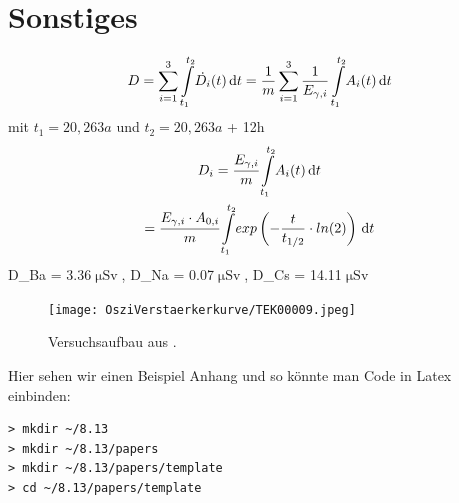 \documentclass[aps,twocolumn,secnumarabic,nobalancelastpage,amsmath,amssymb,
nofootinbib,superscriptaddress]{revtex4-1}
\begin{document}
\clearpage
\appendix

\section{Sonstiges}

\begin{equation}
  D = \sum\limits_{i=1}^3 \int\limits_{t_1}^{t_2} \! \dot{D_i}(t) \, \mathrm{d}t = \frac{1}{m}\sum\limits_{i=1}^3
  \frac{1}{E_{\gamma,i}} \int\limits_{t_1}^{t_2} \! A_{i}(t) \, \mathrm{d}t  \newline
\end{equation}
mit $t_1 = 20,263a$ und $t_2 = 20,263a$ + 12h
\begin{equation}
  \begin{gathered}
    D_i = \cfrac{E_{\gamma,i}}{m} \int\limits_{t_1}^{t_2} \! A_i(t) \, \mathrm{d}t \\
    = \cfrac{E_{\gamma,i}\cdot A_{0,i}}{m} \int\limits_{t_1}^{t_2} \! exp\left(-\frac{t}{t_{1/2}}\cdot ln(2)\right) \, \mathrm{d}t
  \end{gathered}
\end{equation}
\Rightarrow D_{Ba} = 3.36\:$\upmu\text{Sv}$,\: D_{Na} = 0.07\:$\upmu\text{Sv}$,\: D_{Cs} = 14.11\:$\upmu\text{Sv}$
\vspace{3em}

\begin{figure}[h]
  \centering
  \texttt{[image: OsziVerstaerkerkurve/TEK00009.jpeg]}
  \caption{\label{fig:aufbau} Versuchsaufbau aus \cite{skript07}.}
\end{figure}

Hier sehen wir einen Beispiel Anhang und so könnte man Code in Latex einbinden:
\begin{verbatim}
> mkdir ~/8.13
> mkdir ~/8.13/papers
> mkdir ~/8.13/papers/template
> cd ~/8.13/papers/template
\end{verbatim}


\end{document}
